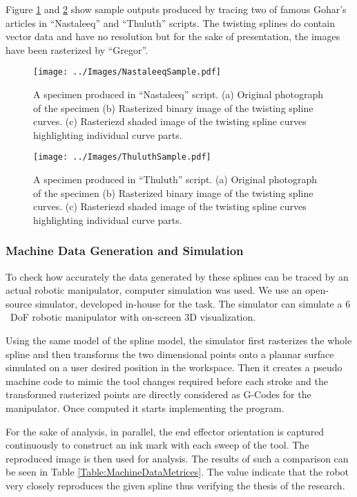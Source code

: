 Figure \ref{Fig:Nastaleeq} and \ref{Fig:Thuluth} show sample outputs produced by tracing two of famous Gohar's articles in ``Nastaleeq'' and ``Thuluth'' scripts. The twisting splines do contain vector data and have no resolution but for the sake of presentation, the images have been rasterized by ``Gregor''.

    \begin{figure}[!t]
        \centering
        \texttt{[image: ../Images/NastaleeqSample.pdf]}
      \caption{
        A specimen produced in ``Nastaleeq'' script. (a) Original photograph of the specimen (b) Rasterized binary image of the twisting spline curves. (c) Rasteriezd shaded image of the twisting spline curves highlighting individual curve parts.}
      \label{Fig:Nastaleeq}
    \end{figure}


    \begin{figure}[!t]
    \centering
    \texttt{[image: ../Images/ThuluthSample.pdf]}
    \caption{
        A specimen produced in ``Thuluth'' script. (a) Original photograph of the specimen (b) Rasterized binary image of the twisting spline curves. (c) Rasteriezd shaded image of the twisting spline curves highlighting individual curve parts.
    }
  \label{Fig:Thuluth}
\end{figure}

\subsubsection{Machine Data Generation and Simulation}
    To check how accurately the data generated by these splines can be traced by an actual robotic manipulator, computer simulation was used. We use an open-source simulator, developed in-house for the task. The simulator can simulate a $6$~DoF robotic manipulator with on-screen $3$D visualization.

    Using the same model of the spline model, the simulator first rasterizes the whole spline and then transforms the two dimensional points onto a plannar surface simulated on a user desired position in the workspace. Then it creates a pseudo machine code to mimic the tool changes required before each stroke and the transformed rasterized points are directly considered as G-Codes for the manipulator. Once computed it starts implementing the program.

    For the sake of analysis, in parallel, the end effector orientation is captured continuously to construct an ink mark with each sweep of the tool. The reproduced image is then used for analysis. The results of such a comparison can be seen in Table \ref{Table:MachineDataMetrices}. The value indicate that the robot very closely reproduces the given spline thus verifying the thesis of the research.

